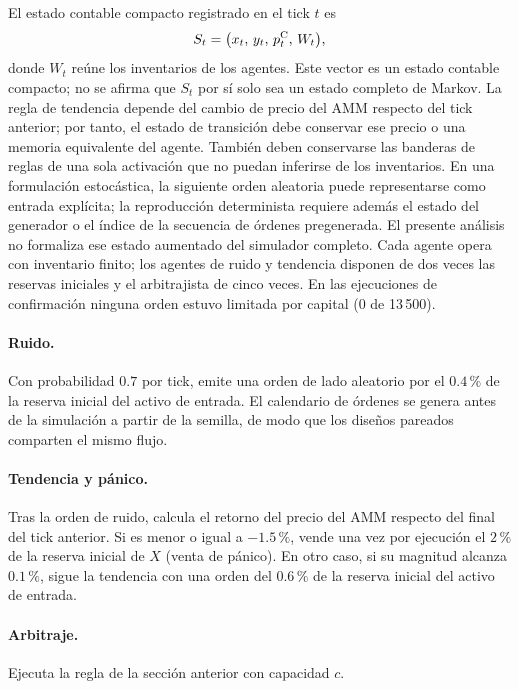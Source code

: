 El estado contable compacto registrado en el tick $t$ es
\begin{equation}
  S_t = \bigl(x_t,\,y_t,\,p^{\mathrm{C}}_t,\,W_t\bigr),
  \label{eq:estado}
\end{equation}
donde $W_t$ reúne los inventarios de los agentes. Este vector es un estado contable compacto; no se afirma que $S_t$ por sí solo sea un estado completo de Markov. La regla de tendencia depende del cambio de precio del AMM respecto del tick anterior; por tanto, el estado de transición debe conservar ese precio o una memoria equivalente del agente. También deben conservarse las banderas de reglas de una sola activación que no puedan inferirse de los inventarios. En una formulación estocástica, la siguiente orden aleatoria puede representarse como entrada explícita; la reproducción determinista requiere además el estado del generador o el índice de la secuencia de órdenes pregenerada. El presente análisis no formaliza ese estado aumentado del simulador completo. Cada agente opera con inventario finito; los agentes de ruido y tendencia disponen de dos veces las reservas iniciales y el arbitrajista de cinco veces. En las ejecuciones de confirmación ninguna orden estuvo limitada por capital (0 de 13\,500).

\paragraph{Ruido.} Con probabilidad $0.7$ por tick, emite una orden de lado aleatorio por el $0.4\,\%$ de la reserva inicial del activo de entrada. El calendario de órdenes se genera antes de la simulación a partir de la semilla, de modo que los diseños pareados comparten el mismo flujo.

\paragraph{Tendencia y pánico.} Tras la orden de ruido, calcula el retorno del precio del AMM respecto del final del tick anterior. Si es menor o igual a $-1.5\,\%$, vende una vez por ejecución el $2\,\%$ de la reserva inicial de $X$ (venta de pánico). En otro caso, si su magnitud alcanza $0.1\,\%$, sigue la tendencia con una orden del $0.6\,\%$ de la reserva inicial del activo de entrada.

\paragraph{Arbitraje.} Ejecuta la regla de la sección anterior con capacidad $c$.

